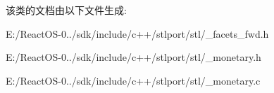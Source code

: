 该类的文档由以下文件生成\+:\begin{DoxyCompactItemize}
\item 
E\+:/\+React\+O\+S-\/0../sdk/include/c++/stlport/stl/\+\_\+facets\+\_\+fwd.\+h\item 
E\+:/\+React\+O\+S-\/0../sdk/include/c++/stlport/stl/\+\_\+monetary.\+h\item 
E\+:/\+React\+O\+S-\/0../sdk/include/c++/stlport/stl/\+\_\+monetary.\+c\end{DoxyCompactItemize}
